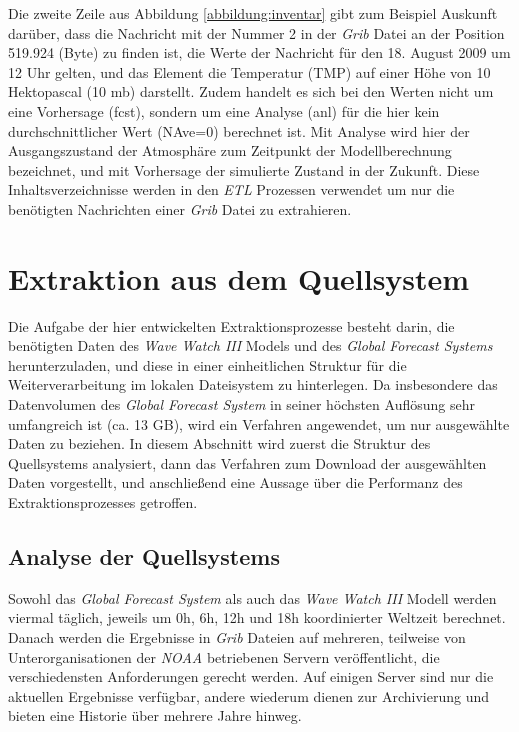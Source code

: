Die zweite Zeile aus Abbildung \ref{abbildung:inventar} gibt zum
Beispiel Auskunft darüber, dass die Nachricht mit der Nummer 2 in der
\textit{Grib} Datei an der Position 519.924 (Byte) zu finden ist, die
Werte der Nachricht für den 18. August 2009 um 12 Uhr gelten, und das
Element die Temperatur (TMP) auf einer Höhe von 10 Hektopascal (10 mb)
darstellt. Zudem handelt es sich bei den Werten nicht um eine
Vorhersage (fcst), sondern um eine Analyse (anl) für die hier kein
durchschnittlicher Wert (NAve=0) berechnet ist. Mit Analyse wird hier
der Ausgangszustand der Atmosphäre zum Zeitpunkt der Modellberechnung
bezeichnet, und mit Vorhersage der simulierte Zustand in der
Zukunft. Diese Inhaltsverzeichnisse werden in den \textit{ETL}
Prozessen verwendet um nur die benötigten Nachrichten einer
\textit{Grib} Datei zu extrahieren.

\section{Extraktion aus dem Quellsystem}
Die Aufgabe der hier entwickelten Extraktionsprozesse besteht darin,
die benötigten Daten des \textit{Wave Watch III} Models und des
\textit{Global Forecast Systems} herunterzuladen, und diese in einer
einheitlichen Struktur für die Weiterverarbeitung im lokalen
Dateisystem zu hinterlegen. Da insbesondere das Datenvolumen des
\textit{Global Forecast System} in seiner höchsten Auflösung sehr
umfangreich ist (ca. 13 GB), wird ein Verfahren angewendet, um nur
ausgewählte Daten zu beziehen. In diesem Abschnitt wird zuerst die
Struktur des Quellsystems analysiert, dann das Verfahren zum Download
der ausgewählten Daten vorgestellt, und anschließend eine Aussage über
die Performanz des Extraktionsprozesses getroffen.

\subsection{Analyse der Quellsystems}

Sowohl das \textit{Global Forecast System} als auch das \textit{Wave
  Watch III} Modell werden viermal täglich, jeweils um 0h, 6h, 12h und
18h koordinierter Weltzeit berechnet. Danach werden die Ergebnisse in
\textit{Grib} Dateien auf mehreren, teilweise von Unterorganisationen
der \textit{NOAA} betriebenen Servern veröffentlicht, die
verschiedensten Anforderungen gerecht werden. Auf einigen Server sind
nur die aktuellen Ergebnisse verfügbar, andere wiederum dienen zur
Archivierung und bieten eine Historie über mehrere Jahre hinweg.

